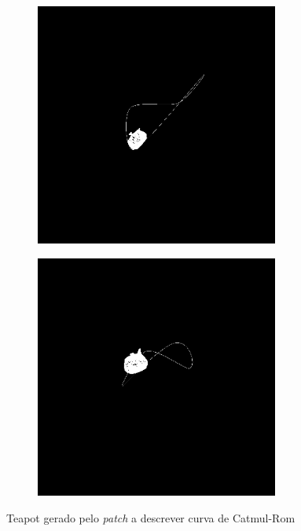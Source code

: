 \documentclass[11pt,a4paper]{report}
\begin{document}
\begin{figure}[H]
\begin{subfigure}{0.5\textwidth}
\end{subfigure}
\begin{subfigure}{0.5\textwidth}
  \centering
  \includegraphics[width = 8cm,height = 8cm]{catmul_teapot3.png}
  \caption{\texttt{}}
  \label{fig:catmul_teapot1}
\end{subfigure}%
\begin{subfigure}{0.5\textwidth}
  \centering
  \includegraphics[width = 8cm,height = 8cm]{catmul_teapot4.png}
  \caption{\texttt{}}
  \label{fig:catmul_teapot1}
\end{subfigure}
\label{fig:teapots}
\caption{Teapot gerado pelo  \textit{patch} a descrever curva de Catmul-Rom}
\end{figure}

\newpage
\end{document}
